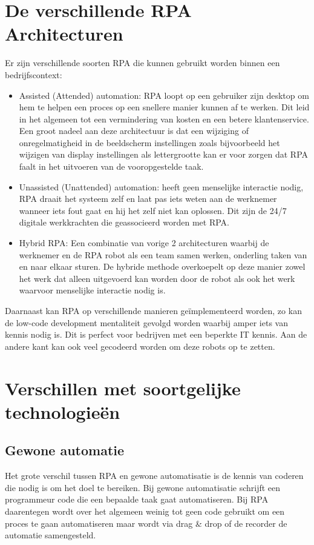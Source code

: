 \section{De verschillende RPA Architecturen}
Er zijn verschillende soorten RPA die kunnen gebruikt worden binnen een bedrijfscontext:

\begin{itemize}
	\item Assisted (Attended) automation: RPA loopt op een gebruiker zijn desktop om hem te helpen een proces op een snellere manier kunnen af te werken. Dit leid in het algemeen tot een vermindering van kosten en een betere klantenservice. Een groot nadeel aan deze architectuur is dat een wijziging of onregelmatigheid in de beeldscherm instellingen zoals bijvoorbeeld het wijzigen van display instellingen als lettergrootte kan er voor zorgen dat RPA faalt in het uitvoeren van de vooropgestelde taak.
	\item Unassisted (Unattended) automation: heeft geen menselijke interactie nodig, RPA draait het systeem zelf en laat pas iets weten aan de werknemer wanneer iets fout gaat en hij het zelf niet kan oplossen. Dit zijn de 24/7 digitale werkkrachten die geassocieerd worden met RPA.
	\item Hybrid RPA: Een combinatie van vorige 2 architecturen waarbij de werknemer en de RPA robot als een team samen werken, onderling taken van en naar elkaar sturen. De hybride methode overkoepelt op deze manier zowel het werk dat alleen uitgevoerd kan worden door de robot als ook het werk waarvoor menselijke interactie nodig is.
\end{itemize}

Daarnaast kan RPA op verschillende manieren geïmplementeerd worden, zo kan de low-code development mentaliteit gevolgd worden waarbij amper iets van kennis nodig is. Dit is perfect voor bedrijven met een beperkte IT kennis. Aan de andere kant kan ook veel gecodeerd worden om deze robots op te zetten.
\autocite{everythingRPA}

\section{Verschillen met soortgelijke technologieën}

\subsection{Gewone automatie}
Het grote verschil tussen RPA en gewone automatisatie is de kennis van coderen die nodig is om het doel te bereiken. Bij gewone automatisatie schrijft een programmeur code die een bepaalde taak gaat automatiseren. Bij RPA daarentegen wordt over het algemeen weinig tot geen code gebruikt om een proces te gaan automatiseren maar wordt via drag \& drop of de recorder de automatie samengesteld. \autocite{everythingRPA}

